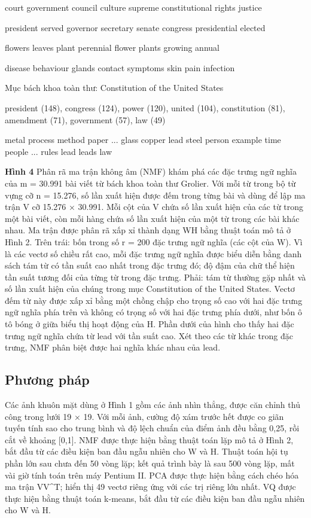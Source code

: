 court government council culture supreme constitutional rights justice

president served governor secretary senate congress presidential elected

flowers leaves plant perennial flower plants growing annual

disease behaviour glands contact symptoms skin pain infection

Mục bách khoa toàn thư: \textquotesingle Constitution of the United States\textquotesingle{}

president (148), congress (124), power (120), united (104), constitution (81), amendment (71), government (57), law (49)

metal process method paper ... glass copper lead steel person example time people ... rules lead leads law

\textbf{Hình 4} Phân rã ma trận không âm (NMF) khám phá các đặc trưng ngữ nghĩa của m = 30.991 bài viết từ bách khoa toàn thư Grolier. Với mỗi từ trong bộ từ vựng cỡ n = 15.276, số lần xuất hiện được đếm trong từng bài và dùng để lập ma trận V cỡ 15.276 × 30.991. Mỗi cột của V chứa số lần xuất hiện của các từ trong một bài viết, còn mỗi hàng chứa số lần xuất hiện của một từ trong các bài khác nhau. Ma trận được phân rã xấp xỉ thành dạng WH bằng thuật toán mô tả ở Hình 2. Trên trái: bốn trong số r = 200 đặc trưng ngữ nghĩa (các cột của W). Vì là các vectơ số chiều rất cao, mỗi đặc trưng ngữ nghĩa được biểu diễn bằng danh sách tám từ có tần suất cao nhất trong đặc trưng đó; độ đậm của chữ thể hiện tần suất tương đối của từng từ trong đặc trưng. Phải: tám từ thường gặp nhất và số lần xuất hiện của chúng trong mục \textquotesingle Constitution of the United States\textquotesingle. Vectơ đếm từ này được xấp xỉ bằng một chồng chập cho trọng số cao với hai đặc trưng ngữ nghĩa phía trên và không có trọng số với hai đặc trưng phía dưới, như bốn ô tô bóng ở giữa biểu thị hoạt động của H. Phần dưới của hình cho thấy hai đặc trưng ngữ nghĩa chứa từ \textquotesingle lead\textquotesingle{} với tần suất cao. Xét theo các từ khác trong đặc trưng, NMF phân biệt được hai nghĩa khác nhau của \textquotesingle lead\textquotesingle.

\subsection{Phương pháp}

Các ảnh khuôn mặt dùng ở Hình 1 gồm các ảnh nhìn thẳng, được căn chỉnh thủ công trong lưới 19 × 19. Với mỗi ảnh, cường độ xám trước hết được co giãn tuyến tính sao cho trung bình và độ lệch chuẩn của điểm ảnh đều bằng 0,25, rồi cắt về khoảng {[}0,1{]}. NMF được thực hiện bằng thuật toán lặp mô tả ở Hình 2, bắt đầu từ các điều kiện ban đầu ngẫu nhiên cho W và H. Thuật toán hội tụ phần lớn sau chưa đến 50 vòng lặp; kết quả trình bày là sau 500 vòng lặp, mất vài giờ tính toán trên máy Pentium II. PCA được thực hiện bằng cách chéo hóa ma trận VV\^{}T; hiển thị 49 vectơ riêng ứng với các trị riêng lớn nhất. VQ được thực hiện bằng thuật toán k-means, bắt đầu từ các điều kiện ban đầu ngẫu nhiên cho W và H.

